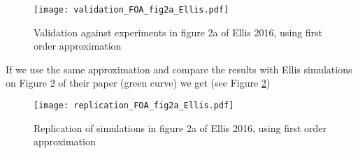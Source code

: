 \begin{figure}
    \centering
    \texttt{[image: validation\_FOA\_fig2a\_Ellis.pdf]} 
    \caption{Validation against experiments in figure 2a of Ellis 2016, using first order approximation}
    \label{fig:val_2a}
 \end{figure}

If we use the same approximation and compare the results with Ellis simulations on
Figure 2 of their paper (green curve) we get (see Figure \ref{fig:rep_2a})

\begin{figure}
    \centering
    \texttt{[image: replication\_FOA\_fig2a\_Ellis.pdf]} 
    \caption{Replication of simulations in figure 2a of Ellis 2016, using first
     order approximation}
    \label{fig:rep_2a}
 \end{figure}